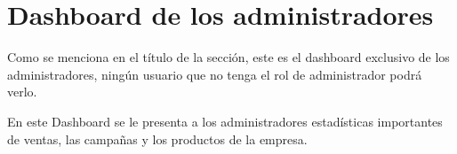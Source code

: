 \section{Dashboard de los administradores}
Como se menciona en el título de la sección, este es el dashboard exclusivo de los administradores, ningún usuario que no tenga el rol de administrador podrá verlo.

En este Dashboard se le presenta a los administradores estadísticas importantes de ventas, las campañas y los productos de la empresa.
    
    
